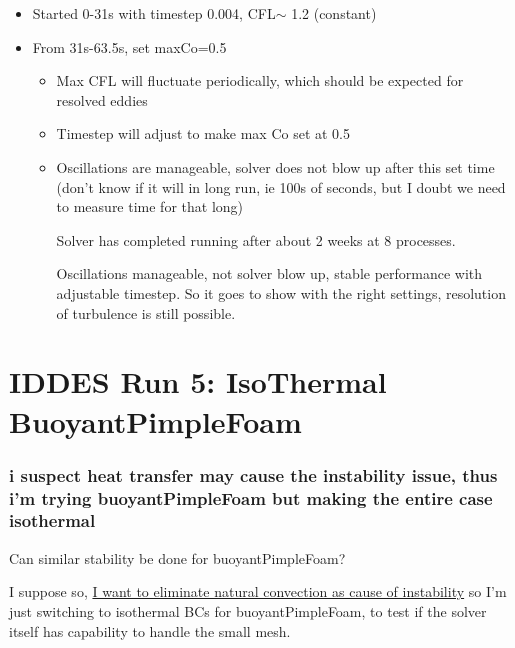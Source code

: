 \documentclass[12pt]{article}
\renewcommand{\_}{\kern-1.5pt\textunderscore\kern-1.5pt}
\begin{document}
\begin{itemize}
	\item Started 0-31s with timestep 0.004, CFL$ \sim $ 1.2 (constant)\par

	\item From 31s-63.5s, set maxCo=0.5\par

\begin{itemize}
	\item Max CFL will fluctuate periodically, which should be expected for resolved eddies\par

	\item Timestep will adjust to make max Co set at 0.5\par

	\item Oscillations are manageable, solver does not blow up after this set time (don’t know if it will in long run, ie 100s of seconds, but I doubt we need to measure time for that long)\par

Solver has completed running after about 2 weeks at 8 processes. \par

Oscillations manageable, not solver blow up, stable performance with adjustable timestep. So it goes to show with the right settings, resolution of turbulence is still possible.\par

\end{itemize}
\end{itemize}

\section{IDDES Run 5: IsoThermal BuoyantPimpleFoam}\par

\subsubsection{i suspect heat transfer may cause the instability issue, thus i'm trying buoyantPimpleFoam but making the entire case isothermal}
Can similar stability be done for buoyantPimpleFoam?\par

I suppose so, \uline{I want to eliminate natural convection as cause of instability} so I’m just switching to isothermal BCs for buoyantPimpleFoam, to test if the solver itself has capability to handle the small mesh.\par
\end{document}
